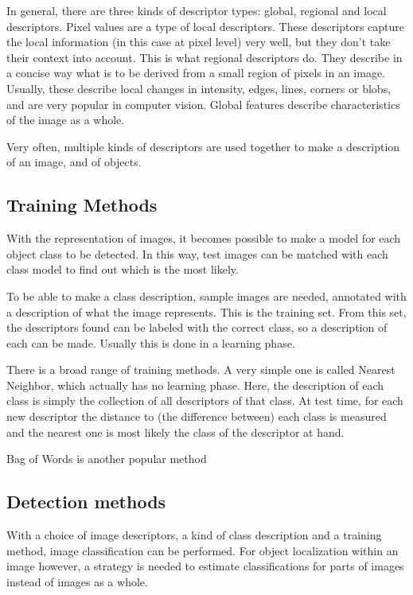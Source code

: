\documentclass[a4paper,10pt]{article}
\begin{document}
In general, there are three kinds of descriptor types: global, regional and local descriptors. Pixel values are a type of local descriptors. These descriptors capture the local information (in this case at pixel level) very well, but they don't take their context into account. This is what regional descriptors do. They describe in a concise way what is to be derived from a small region of pixels in an image. Usually, these describe local changes in intensity, edges, lines, corners or blobs, and are very popular in computer vision. Global features describe characteristics of the image as a whole. 

Very often, multiple kinds of descriptors are used together to make a description of an image, and of objects.


\subsection{Training Methods} %
\label{sub:training_methods}
With the representation of images, it becomes possible to make a model for each object class to be detected. In this way, test images can be matched with each class model to find out which is the most likely.

To be able to make a class description, sample images are needed, annotated with a description of what the image represents. This is the training set. From this set, the descriptors found can be labeled with the correct class, so a description of each can be made. Usually this is done in a learning phase.

There is a broad range of training methods. A very simple one is called Nearest Neighbor, which actually has no learning phase. Here, the description of each class is simply the collection of all descriptors of that class. At test time, for each new descriptor the distance to (the difference between) each class is measured and the nearest one is most likely the class of the descriptor at hand. \cite{boiman2008defense}

Bag of Words is another popular method \cite{lazebnik2006beyond, van2011exploiting} 

\subsection{Detection methods} %
\label{sub:detection_methods}
With a choice of image descriptors, a kind of class description and a training method, image classification can be performed. For object localization within an image however, a strategy is needed to estimate classifications for parts of images instead of images as a whole.
\end{document}

